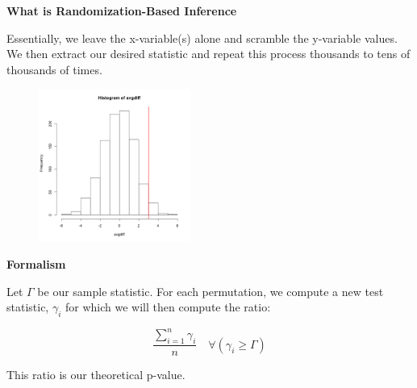 \documentclass{beamer}
\begin{document}
\begin{frame}{\textbf{What is Randomization-Based Inference}}
    
    Essentially, we leave the x-variable(s) alone and scramble the y-variable values. We then extract our desired statistic and repeat this process thousands to tens of thousands of times. 
    
    \begin{figure}[htp]
        \centering
        \includegraphics[width=5cm]{permutation_tests-diff_hist-1.png}
    \end{figure}
    
\end{frame}

\begin{frame}{\textbf{Formalism}}
    
    \newline\quad
    
    Let $\Gamma$ be our sample statistic. For each permutation, we compute a new test statistic, $\gamma_i$ for which we will then compute the ratio:
    
    $$\dfrac{\sum\limits_{i=1}^{n}\gamma_i}{n}\quad\forall (\gamma_i\geq\Gamma)$$
    
    \begin{center}
        This ratio is our theoretical p-value.
    \end{center}
    
\end{frame}
\end{document}
